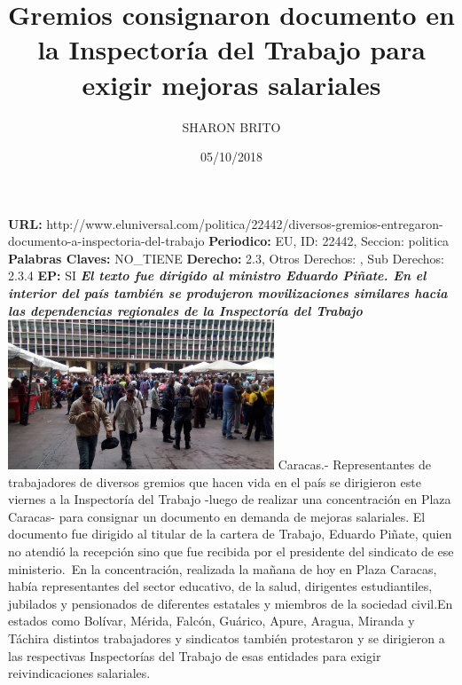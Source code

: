 \documentclass{article}%
\title{\textbf{Gremios consignaron documento en la Inspectoría del Trabajo para exigir mejoras salariales}}%
\author{SHARON BRITO}%
\date{05/10/2018}%
\begin{document}
%
\normalsize%
\maketitle%
\textbf{URL: }%
http://www.eluniversal.com/politica/22442/diversos{-}gremios{-}entregaron{-}documento{-}a{-}inspectoria{-}del{-}trabajo\newline%
%
\textbf{Periodico: }%
EU, %
ID: %
22442, %
Seccion: %
politica\newline%
%
\textbf{Palabras Claves: }%
NO\_TIENE\newline%
%
\textbf{Derecho: }%
2.3, %
Otros Derechos: %
, %
Sub Derechos: %
2.3.4\newline%
%
\textbf{EP: }%
SI\newline%
\newline%
%
\textbf{\textit{El texto fue dirigido al ministro Eduardo Piñate. En el interior del país también se produjeron movilizaciones similares hacia las dependencias regionales de la Inspectoría del Trabajo}}%
\newline%
\newline%
%
\includegraphics[width=300px]{56.jpg}%
\newline%
%
Caracas.{-} Representantes de trabajadores de diversos gremios que hacen vida en el país se dirigieron este viernes a la Inspectoría del Trabajo {-}luego de realizar una concentración en Plaza Caracas{-} para consignar un documento en demanda de mejoras salariales.%
\newline%
%
El documento fue dirigido al titular de la cartera de Trabajo, Eduardo Piñate, quien no atendió la recepción sino que fue recibida por el presidente del sindicato de ese ministerio.~En la concentración, realizada la mañana de hoy en Plaza Caracas, había representantes del sector educativo, de la salud, dirigentes estudiantiles, jubilados y pensionados de diferentes estatales y miembros de la sociedad civil.En estados como Bolívar, Mérida, Falcón, Guárico, Apure, Aragua, Miranda y Táchira distintos trabajadores y sindicatos también protestaron y se dirigieron a las respectivas Inspectorías del Trabajo de esas entidades para exigir reivindicaciones salariales.%
\end{document}

